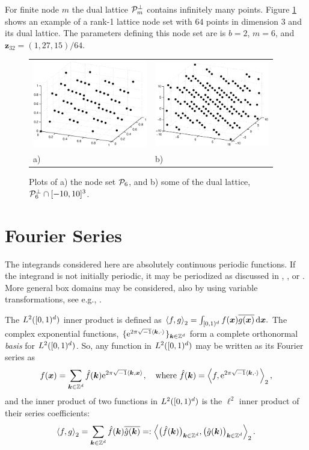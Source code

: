 \documentclass[graybox]{svmult}
\newcommand{\Z}{\mathbb{Z}} %
\newcommand{\bsx}{\boldsymbol{x}}    %
\newcommand{\bsz}{\boldsymbol{z}}    %
\begin{document}
For finite node $m$ the dual lattice $\mathcal{P}^{\perp}_{m}$ contains infinitely many points. Figure \ref{Latticefig} shows an example of a rank-1 lattice node set with $64$ points in dimension $3$ and its dual lattice. The parameters defining this node set are is $b=2$, $m=6$, and $\bsz_{32}=(1,27,15)/64$.
\begin{figure}[h!]
\centering
\begin{tabular}{>{\centering}p{5cm}>{\centering}p{5cm}}
\includegraphics[width=5cm]{Images/Lattice64.eps} &
\includegraphics[width=5cm]{Images/DualLattice64.eps}\tabularnewline
a) & b)
\end{tabular}
\caption{Plots of a) the node set $\mathcal{P}_6$, and b) some of the dual lattice, $\mathcal{P}_6^{\perp} \cap [-10,10]^3$.}\label{Latticefig}
\end{figure}

\section{Fourier Series}\label{secfourierseries}

The integrands considered here are absolutely continuous periodic functions. If the integrand is not initially periodic, it may be periodized as discussed in \cite{Hic01a}, \cite{Sid93}, or \cite[Sec. 2.12]{SloJoe94}. More general box domains may be considered, also by using variable transformations, see e.g.,  \cite{HicSloWas03a,HicSloWas03e}.

The $L^2([0,1)^d)$ inner product is defined as
$
\ip[2]{f}{g} = \int_{\cube} f(\bsx) \overline{g(\bsx)} \, \dif \bsx.
$
The complex exponential functions, $\{\E^{2 \pi \sqrt{-1} \ip{\bsk}{\cdot}}\}_{\bsk \in \Z^d}$ form a complete orthonormal \emph{basis} for $L^2([0,1)^d)$. So, any function in $L^2([0,1)^d)$ may be written as its Fourier series as
\begin{equation} \label{Fourierdef}
f(\bsx) = \sum_{\bsk \in \Z^d} \hf(\bsk) \E^{2 \pi \sqrt{-1} \ip{\bsk}{\bsx}}, \quad \text{where } \hf(\bsk) = \ip[2]{f}{\E^{2 \pi \sqrt{-1} \ip{\bsk}{\cdot}}},
\end{equation}
and the inner product of two functions in $L^2([0,1)^d)$ is the $\ell^2$ inner product of their series coefficients:
\[
\ip[2]{f}{g} = \sum_{\bsk \in \Z^d} \hf(\bsk)\overline{\hg(\bsk)} =: \ip[2]{\bigl(\hf(\bsk)\bigr)_{\bsk \in \Z^d}}{\bigl ( \hg(\bsk)\bigr )_{\bsk \in \Z^d}}.
\]
\end{document}
